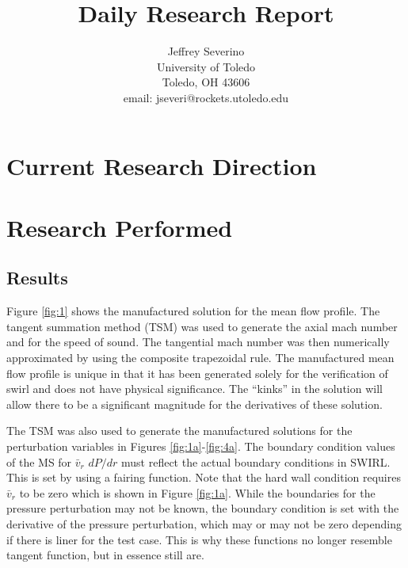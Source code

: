 \documentclass[a4paper]{article}
\begin{document}
\begin{titlepage}

    \title{
    Daily Research Report}

    \author{ Jeffrey Severino \\
        University of Toledo \\
        Toledo, OH  43606 \\
    email: jseveri@rockets.utoledo.edu}


    \maketitle

\end{titlepage}
\section{Current Research Direction}
\section{Research Performed}

\subsection{Results}
Figure \ref{fig:1} shows the manufactured solution for the mean flow profile. 
The tangent summation method (TSM) was used to generate the axial mach number and 
for the speed of sound.   The tangential mach number was then numerically approximated by 
using the composite trapezoidal rule. The manufactured mean flow profile 
is unique in that it has been generated solely for the verification of swirl 
and does not have physical significance. The ``kinks'' in the solution will allow
there to be a significant magnitude for the derivatives of these solution. 

The TSM was also used to generate the manufactured solutions for the perturbation
variables in Figures \ref{fig:1a}-\ref{fig:4a}. The boundary condition values of 
the MS for $\bar{v}_r$ $dP/dr$ must reflect the actual boundary conditions in SWIRL. 
This is set by using a fairing function. Note that the hard wall condition requires
$\bar{v}_r$ to be zero which is shown in Figure \ref{fig:1a}. While the boundaries for the 
pressure perturbation may not be known, the boundary condition is set with the 
derivative of the pressure perturbation, which may or may not be zero depending
if there is liner for the test case. This is why these functions no longer resemble
tangent function, but in essence still are. 
\end{document}
